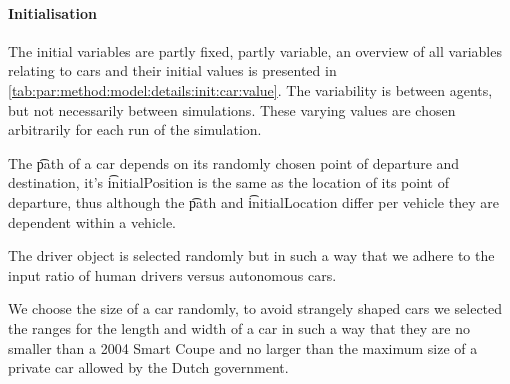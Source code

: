 \paragraph{Initialisation}
\label{par:method:model:details:initialization}
The initial variables are partly fixed, partly variable, an overview of all variables relating to cars and their initial values is presented in \cref{tab:par:method:model:details:init:car:value}. The variability is between agents, but not necessarily between simulations. These varying values are chosen arbitrarily for each run of the simulation.

The \t{path} of a car depends on its randomly chosen point of departure and destination, it's \t{initialPosition} is the same as the location of its point of departure, thus although the \t{path} and \t{initialLocation} differ per vehicle they are dependent within a vehicle. 

The driver object is selected randomly but in such a way that we adhere to the input ratio of human drivers versus autonomous cars. 

We choose the size of a car randomly, to avoid strangely shaped cars we selected the ranges for the length and width of a car in such a way that they are no smaller than a 2004 Smart Coupe and no larger than the maximum size of a private car allowed by the Dutch government. 


